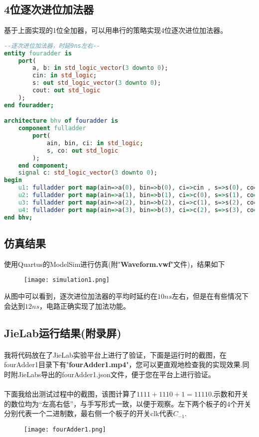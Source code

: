 \documentclass[UTF8, onecolumn, a4paper]{article}
\begin{document}
\subsection{4位逐次进位加法器}
基于上面实现的1位全加器，可以用串行的策略实现4位逐次进位加法器。
\begin{lstlisting}[language={VHDL}, title={fouradder.vhd}]
--逐次进位加法器，时延9ns左右--
entity fouradder is
	port(
		a, b: in std_logic_vector(3 downto 0);
		cin: in std_logic;
		s: out std_logic_vector(3 downto 0);
		cout: out std_logic
	);
end fouradder;

architecture bhv of fouradder is
	component fulladder
		port(
			ain, bin, ci: in std_logic;
			s, co: out std_logic
		);
	end component;
	signal c: std_logic_vector(3 downto 0);
begin
	u1: fulladder port map(ain=>a(0), bin=>b(0), ci=>cin , s=>s(0), co=>c(0) );--元件例化
	u2: fulladder port map(ain=>a(1), bin=>b(1), ci=>c(0), s=>s(1), co=>c(1) );
	u3: fulladder port map(ain=>a(2), bin=>b(2), ci=>c(1), s=>s(2), co=>c(2) );
	u4: fulladder port map(ain=>a(3), bin=>b(3), ci=>c(2), s=>s(3), co=>cout );
end bhv;
\end{lstlisting}
\subsection{仿真结果}
使用Quartus的ModelSim进行仿真(附"\textbf{Waveform.vwf}"文件)，结果如下
\begin{figure}[htb]
	\centering
	\texttt{[image: simulation1.png]}
\end{figure}
从图中可以看到，逐次进位加法器的平均时延约在$10ns$左右，但是在有些情况下会达到$12ns$，电路正确实现了加法功能。
\subsection{JieLab运行结果(附录屏)}
\paragraph*{}
我将代码放在了JieLab实验平台上进行了验证，下面是运行时的截图，在fourAdder1目录下有"\textbf{fourAdder1.mp4}"，您可以更直观地检查我的实现效果.同时附JieLabs导出的fourAdder1.json文件，便于您在平台上进行验证。
\paragraph*{}
下面我给出测试过程中的截图，该图计算了$1111 + 1110 + 1 = 11110$.示数和开关的数位均为“左高右低”，与手写形式一致，以便于观察。左下两个板子的4个开关分别代表一个二进制数，最右侧一个板子的开关clk代表$C_{-1}$.
\begin{figure}[htb]
	\centering
	\texttt{[image: fourAdder1.png]}
\end{figure}
\end{document}
